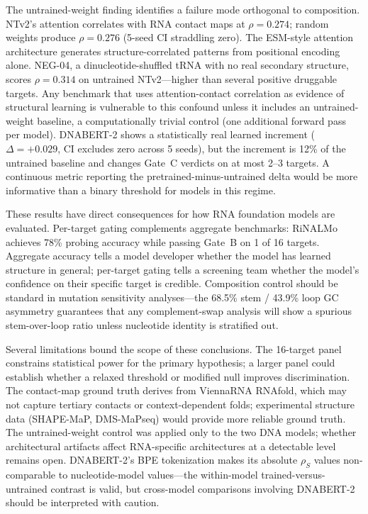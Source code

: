\documentclass[11pt]{article}
\begin{document}
The untrained-weight finding identifies a failure mode orthogonal to
composition. NTv2's attention correlates with RNA contact maps at
$\rho = 0.274$; random weights produce $\rho = 0.276$ (5-seed CI straddling
zero). The ESM-style attention architecture generates structure-correlated
patterns from positional encoding alone. NEG-04, a dinucleotide-shuffled
tRNA with no real secondary structure, scores $\rho = 0.314$ on untrained
NTv2---higher than several positive druggable targets. Any benchmark that
uses attention-contact correlation as evidence of structural learning is
vulnerable to this confound unless it includes an untrained-weight baseline,
a computationally trivial control (one additional forward pass per model).
DNABERT-2 shows a statistically real learned increment ($\Delta = +0.029$,
CI excludes zero across 5 seeds), but the increment is 12\% of the
untrained baseline and changes Gate~C verdicts on at most 2--3 targets. A
continuous metric reporting the pretrained-minus-untrained delta would be
more informative than a binary threshold for models in this regime.

These results have direct consequences for how RNA foundation models are
evaluated. Per-target gating complements aggregate benchmarks: RiNALMo
achieves 78\% probing accuracy while passing Gate~B on 1 of 16 targets.
Aggregate accuracy tells a model developer whether the model has learned
structure in general; per-target gating tells a screening team whether
the model's confidence on their specific target is credible. Composition
control should be standard in mutation sensitivity analyses---the 68.5\%
stem / 43.9\% loop GC asymmetry guarantees that any complement-swap
analysis will show a spurious stem-over-loop ratio unless nucleotide
identity is stratified out.

Several limitations bound the scope of these conclusions. The 16-target
panel constrains statistical power for the primary hypothesis; a larger
panel could establish whether a relaxed threshold or modified null improves
discrimination. The contact-map ground truth derives from ViennaRNA RNAfold,
which may not capture tertiary contacts or context-dependent folds;
experimental structure data (SHAPE-MaP, DMS-MaPseq) would provide more
reliable ground truth. The untrained-weight control was applied only to the
two DNA models; whether architectural artifacts affect RNA-specific
architectures at a detectable level remains open. DNABERT-2's BPE
tokenization makes its absolute $\rho_S$ values non-comparable to
nucleotide-model values---the within-model trained-versus-untrained contrast
is valid, but cross-model comparisons involving DNABERT-2 should be
interpreted with caution.
\end{document}
